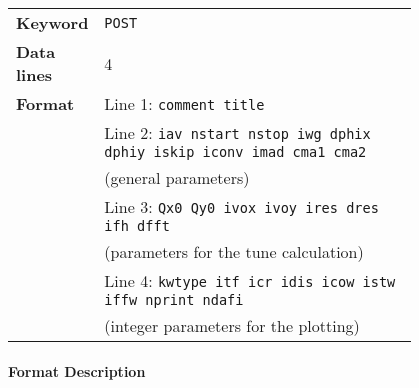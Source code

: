 \bigskip
\begin{tabular}{@{}lp{0.8\linewidth}}
    \textbf{Keyword}    & \texttt{POST}\index{POST} \\
    \textbf{Data lines} & 4 \\
    \textbf{Format}     & Line 1: \texttt{comment title} \\
                        & Line 2: \texttt{iav nstart nstop iwg dphix dphiy iskip iconv imad cma1 cma2} \\
                        & (general parameters) \\
                        & Line 3: \texttt{Qx0 Qy0 ivox ivoy ires dres ifh dfft} \\
                        & (parameters for the tune calculation) \\
                        & Line 4: \texttt{kwtype itf icr idis icow istw iffw nprint ndafi} \\
                        & (integer parameters for the plotting)
\end{tabular}

\paragraph{Format Description}~

